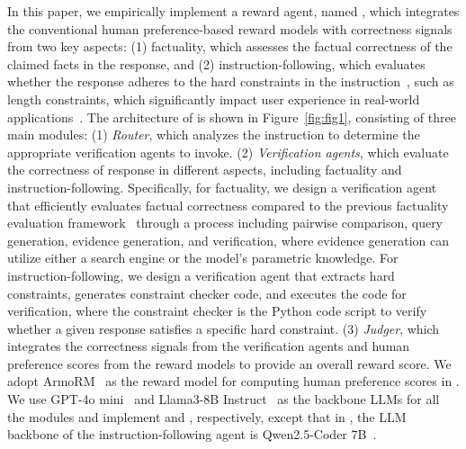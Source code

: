 In this paper, we empirically implement a reward agent, named \ourmethod, which integrates the conventional human preference-based reward models with correctness signals from two key aspects: (1) factuality, which assesses the factual correctness of the claimed facts in the response, and (2) instruction-following, which evaluates whether the response adheres to the hard constraints in the instruction~\citep{zhou2023instruction}, such as length constraints, which significantly impact user experience in real-world applications~\citep{sun2024conifer, qi2024constraint}.
The architecture of \ourmethod is shown in Figure~\ref{fig:fig1}, consisting of three main modules: (1) \textit{Router}, which analyzes the instruction to determine the appropriate verification agents to invoke. (2) \textit{Verification agents}, which evaluate the correctness of response in different aspects, including factuality and instruction-following. Specifically, for factuality, we design a verification agent that efficiently evaluates factual correctness compared to the previous factuality evaluation framework~\citep{min2023factscore} through a process including pairwise comparison, query generation, evidence generation, and verification, where evidence generation 
can utilize either a search engine or the model's parametric knowledge. For instruction-following, we design a verification agent that extracts hard constraints, generates constraint checker code, and executes the code for verification, where the constraint checker is the Python code script to verify whether a given response satisfies a specific hard constraint.
(3) \textit{Judger}, which integrates the correctness signals from the verification agents and human preference scores from the reward models to provide an overall reward score.
We adopt ArmoRM~\citep{wang2024interpretable} as the reward model for computing human preference scores in \ourmethod. We use GPT-4o mini~\citep{OpenAI2024} and Llama3-8B Instruct~\citep{dubey2024llama} as the backbone LLMs for all the modules and implement \ourmethodmini and \ourmethodllama, respectively, except that in \ourmethodllama, the LLM backbone of the instruction-following agent is Qwen2.5-Coder 7B~\citep{hui2024qwen2}. 


